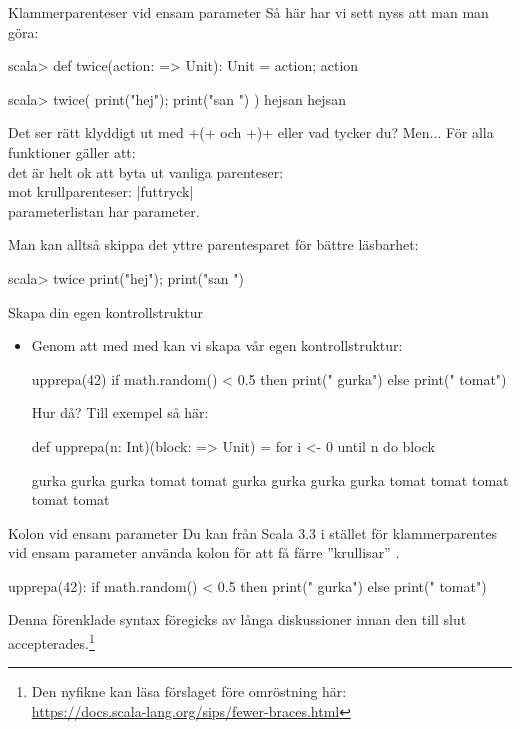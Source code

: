 \begin{Slide}{Klammerparenteser vid ensam parameter}
Så här har vi sett nyss att man man göra:
\begin{REPL}
scala> def twice(action: => Unit): Unit = { action; action }

scala> twice( { print("hej"); print("san ") } )
hejsan hejsan
\end{REPL}

Det ser rätt klyddigt ut med \code+{(+  och \code+)}+ eller vad tycker du? \pause Men...
För alla funktioner  gäller att: \\ det är helt ok att byta ut vanliga parenteser: \hfill{} \\ mot krullparenteser: \hfill\code|f{uttryck}| \\  parameterlistan har  parameter.

\vspace{0.5em}Man kan alltså skippa det yttre parentesparet för bättre läsbarhet:
\begin{REPLnonum}
scala> twice { print("hej"); print("san ") }
\end{REPLnonum}
\end{Slide}



\begin{Slide}{Skapa din egen kontrollstruktur}\SlideFontSmall
\begin{itemize}
\item Genom att   med  med  kan vi skapa vår egen kontrollstruktur:  \pause
\begin{Code}
upprepa(42){
  if math.random() < 0.5 then print(" gurka")
  else print(" tomat")
}
\end{Code}
Hur då?
\pause
 Till exempel så här:
\begin{Code}
def upprepa(n: Int)(block: => Unit) = for i <- 0 until n do block
\end{Code}

\pause

\begin{REPLnonum}
gurka gurka gurka tomat tomat gurka gurka gurka gurka tomat tomat tomat tomat tomat
\end{REPLnonum}
\end{itemize}
\end{Slide}


\begin{Slide}{Kolon vid ensam parameter}\SlideFontSmall
Du kan från Scala 3.3 i stället för klammerparentes vid ensam parameter använda kolon för att få färre ''krullisar'' .
\begin{Code}
  upprepa(42):
    if math.random() < 0.5 
    then print(" gurka")
    else print(" tomat")
\end{Code}
Denna förenklade syntax föregicks av långa diskussioner innan den till slut accepterades.\footnote{
Den nyfikne kan läsa förslaget före omröstning här: \\ \url{https://docs.scala-lang.org/sips/fewer-braces.html}}
\end{Slide}

